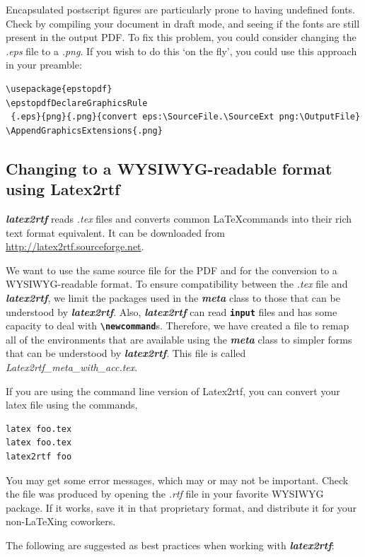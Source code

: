 \documentclass[12pt,letterpaper]{article}
\newcommand{\fn}[1]{\emph{#1}}
\newcommand{\packagename}[1]{\textbf{\emph{#1}}}
\newcommand{\envname}[1]{\textbf{\texttt{#1}}}
\begin{document}
Encapsulated postscript figures are particularly prone to having undefined fonts. Check by compiling your document in draft mode, and seeing if the fonts are still present in the output PDF. To fix this problem, you could consider changing the \emph{.eps} file to a \emph{.png}. If you wish to do this `on the fly', you could use this approach in your preamble:

\begin{verbatim}
\usepackage{epstopdf}
\epstopdfDeclareGraphicsRule
 {.eps}{png}{.png}{convert eps:\SourceFile.\SourceExt png:\OutputFile}
\AppendGraphicsExtensions{.png}
\end{verbatim}

\subsection{Changing to a WYSIWYG-readable format using Latex2rtf}
\packagename{latex2rtf} reads \fn{.tex} files and converts common \LaTeX commands into their rich text format equivalent. It can be downloaded from \url{http://latex2rtf.sourceforge.net}.

We want to use the same source file for the PDF and for the conversion to a WYSIWYG-readable format. To ensure compatibility between the \fn{.tex} file and \packagename{latex2rtf}, we limit the packages used in the \packagename{meta} class to those that can be understood by \packagename{latex2rtf}. Also, \packagename{latex2rtf} can read \envname{input} files and has some capacity to deal with \envname{\textbackslash newcommand}s. Therefore, we have created a file to remap all of the environments that are available using the \packagename{meta} class to simpler forms that can be understood by \packagename{latex2rtf}. This file is called \fn{Latex2rtf\_meta\_with\_acc.tex}. 

If you are using the command line version of Latex2rtf, you can convert your latex file using the commands,

\begin{verbatim}
latex foo.tex
latex foo.tex
latex2rtf foo
\end{verbatim}

You may get some error messages, which may or may not be important. Check the file was produced by opening the \fn{.rtf} file in your favorite WYSIWYG package. If it works, save it in that proprietary format, and distribute it for your non-\LaTeX ing coworkers.

The following are suggested as best practices when working with \packagename{latex2rtf}:
\end{document}
